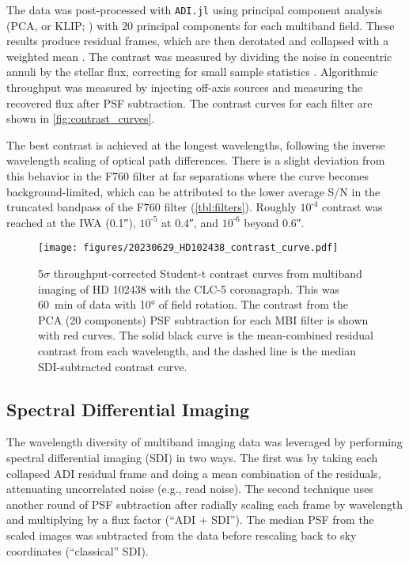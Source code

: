 The data was post-processed with \texttt{ADI.jl} \citep{lucas_adijl_2020} using principal component analysis (PCA, or KLIP; \citealt{soummer_detection_2012}) with 20 principal components for each multiband field. These results produce residual frames, which are then derotated and collapsed with a weighted mean \citep{bottom_noise-weighted_2017}. The contrast was measured by dividing the noise in concentric annuli by the stellar flux, correcting for small sample statistics \citep{mawet_fundamental_2014}. Algorithmic throughput was measured by injecting off-axis sources and measuring the recovered flux after PSF subtraction. The contrast curves for each filter are shown in \autoref{fig:contrast_curves}.

The best contrast is achieved at the longest wavelengths, following the inverse wavelength scaling of optical path differences. There is a slight deviation from this behavior in the F760 filter at far separations where the curve becomes background-limited, which can be attributed to the lower average S/N in the truncated bandpass of the F760 filter (\autoref{tbl:filters}). Roughly $10^{\text{-}4}$ contrast was reached at the IWA (\ang{;;0.1}), $10^{\text{-}5}$ at \ang{;;0.4}, and $10^{\text{-}6}$ beyond \ang{;;0.6}.


\begin{figure}
    \centering
    \texttt{[image: figures/20230629\_HD102438\_contrast\_curve.pdf]}
    \caption{5$\sigma$ throughput-corrected Student-t contrast curves from multiband imaging of HD 102438 with the CLC-5 coronagraph. This was \SI{60}{\minute} of data with \ang{10} of field rotation. The contrast from the PCA (20 components) PSF subtraction for each MBI filter is shown with red curves. The solid black curve is the mean-combined residual contrast from each wavelength, and the dashed line is the median SDI-subtracted contrast curve. \label{fig:contrast_curves}}
\end{figure}


\subsection{Spectral Differential Imaging}\label{sec:sdi}

The wavelength diversity of multiband imaging data was leveraged by performing spectral differential imaging (SDI) in two ways. The first was by taking each collapsed ADI residual frame and doing a mean combination of the residuals, attenuating uncorrelated noise (e.g., read noise). The second technique uses another round of PSF subtraction after radially scaling each frame by wavelength and multiplying by a flux factor (``ADI + SDI''). The median PSF from the scaled images was subtracted from the data before rescaling back to sky coordinates (``classical'' SDI).

